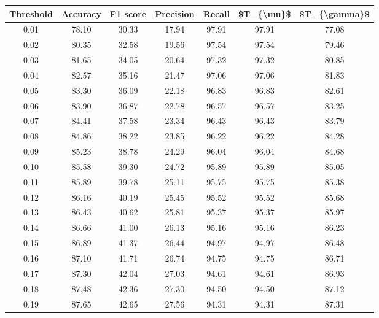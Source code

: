 \begin{tabular}{|c|c|c|c|c|c|c|}
\hline
 Threshold &  Accuracy &  F1 score &  Precision &  Recall &  \$T\_\{\textbackslash mu\}\$ &  \$T\_\{\textbackslash gamma\}\$ \\
\hline
      0.01 &     78.10 &     30.33 &      17.94 &   97.91 &      97.91 &         77.08 \\
      0.02 &     80.35 &     32.58 &      19.56 &   97.54 &      97.54 &         79.46 \\
      0.03 &     81.65 &     34.05 &      20.64 &   97.32 &      97.32 &         80.85 \\
      0.04 &     82.57 &     35.16 &      21.47 &   97.06 &      97.06 &         81.83 \\
      0.05 &     83.30 &     36.09 &      22.18 &   96.83 &      96.83 &         82.61 \\
      0.06 &     83.90 &     36.87 &      22.78 &   96.57 &      96.57 &         83.25 \\
      0.07 &     84.41 &     37.58 &      23.34 &   96.43 &      96.43 &         83.79 \\
      0.08 &     84.86 &     38.22 &      23.85 &   96.22 &      96.22 &         84.28 \\
      0.09 &     85.23 &     38.78 &      24.29 &   96.04 &      96.04 &         84.68 \\
      0.10 &     85.58 &     39.30 &      24.72 &   95.89 &      95.89 &         85.05 \\
      0.11 &     85.89 &     39.78 &      25.11 &   95.75 &      95.75 &         85.38 \\
      0.12 &     86.16 &     40.19 &      25.45 &   95.52 &      95.52 &         85.68 \\
      0.13 &     86.43 &     40.62 &      25.81 &   95.37 &      95.37 &         85.97 \\
      0.14 &     86.66 &     41.00 &      26.13 &   95.16 &      95.16 &         86.23 \\
      0.15 &     86.89 &     41.37 &      26.44 &   94.97 &      94.97 &         86.48 \\
      0.16 &     87.10 &     41.71 &      26.74 &   94.75 &      94.75 &         86.71 \\
      0.17 &     87.30 &     42.04 &      27.03 &   94.61 &      94.61 &         86.93 \\
      0.18 &     87.48 &     42.36 &      27.30 &   94.50 &      94.50 &         87.12 \\
      0.19 &     87.65 &     42.65 &      27.56 &   94.31 &      94.31 &         87.31 \\

\end{tabular}
